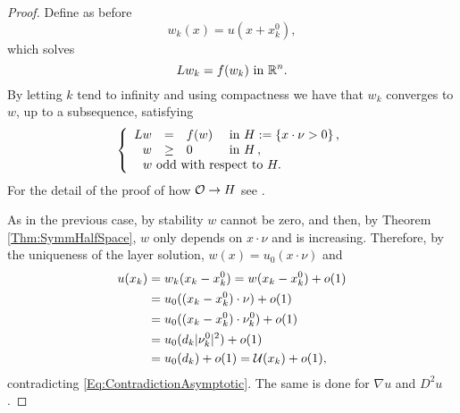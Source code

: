 \begin{proof}
Define as before
$$ w_k (x) = u(x+x_k^0), $$
which solves
$$ L w_k = f(w_k) \ \text{in } \mathbb{R}^n. $$
By letting $k$ tend to infinity and using compactness  we have that $w_k$ converges to $w$, up to a subsequence, satisfying
$$
\beqc{\PDEsystem}
L w &=& f(w)  &\textrm{ in } H:=\{x\cdot \nu >0\}\,,\\
w &\geq& 0  &\textrm{ in } H\,,\\
\,\,w \text{ odd with respect to } H. \span\span\span \,
\eeqc
$$
For the detail of the proof of how $\mathcal{O} \rightarrow H$ see \cite{CabreTerra1}.

As in the previous case, by stability $w$ cannot be zero, and then, by Theorem \ref{Thm:SymmHalfSpace}, $w$ only depends on $x\cdot \nu$ and is increasing. Therefore, by the uniqueness of the layer solution, $w(x) = u_0(x\cdot \nu)$ and
\begin{align*}
u(x_k) &= w_k(x_k-x_k^0) = w(x_k-x_k^0) + o(1) \\
&= u_0((x_k-x_k^0)\cdot \nu) + o(1) \\
&= u_0((x_k-x_k^0)\cdot \nu_k^0) + o(1) \\
&= u_0(d_k |\nu_k^0|^2) + o(1) \\
&= u_0(d_k) + o(1) = \mathcal{U} (x_k) + o(1),
\end{align*}
contradicting \eqref{Eq:ContradictionAsymptotic}. The same is done for $\nabla u$ and $D^2 u$.
\end{proof}